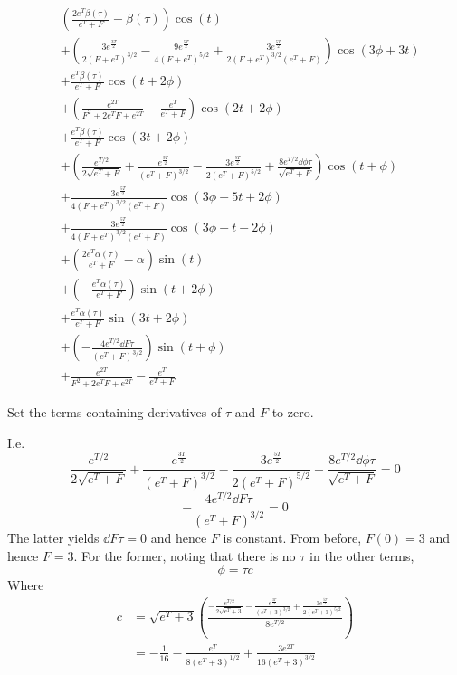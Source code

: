 \documentclass{X:/Documents/Coding/Latex/myassignment}
\begin{document}
\begin{enumerate}
\begin{enumerate}
\begin{align*}
	&\left(\frac{2e^T\beta \left(\tau \right)}{e^T+F}-\beta \left(\tau \right)\right)\cos\left(t\right)\\
	&+\left(\frac{3e^{\frac{3T}{2}}}{2{\left(F+e^T\right)}^{3/2}}-\frac{9e^{\frac{5T}{2}}}{4{\left(F+e^T\right)}^{5/2}}+\frac{3e^{\frac{5T}{2}}}{2{\left(F+e^T\right)}^{3/2}\left(e^T+F\right)}\right)\cos\left(3\phi +3t\right)\\
	&+\frac{e^T\beta \left(\tau \right)}{e^T+F}\cos\left(t+2\phi\right)\\
	&+\left(\frac{e^{2T}}{{F}^2+2e^TF+e^{2T}}-\frac{e^T}{e^T+F}\right)\cos\left(2t+2\phi\right)\\
	&+\frac{e^T\beta \left(\tau \right)}{e^T+F}\cos\left(3t+2\phi\right)\\
	&+\left(\frac{e^{T/2}}{2\sqrt{e^T+F}}+\frac{e^{\frac{3T}{2}}}{{\left(e^T+F\right)}^{3/2}}-\frac{3e^{\frac{5T}{2}}}{2{\left(e^T+F\right)}^{5/2}}+\frac{8e^{T/2}\dd{\phi}{\tau}}{\sqrt{e^T+F}}\right)\cos\left(t+\phi\right)\\
	&+\frac{3e^{\frac{5T}{2}}}{4{\left(F+e^T\right)}^{3/2}\left(e^T+F\right)}\cos\left(3\phi +5t+2\phi\right)\\
	&+\frac{3e^{\frac{5T}{2}}}{4{\left(F+e^T\right)}^{3/2}\left(e^T+F\right)}\cos\left(3\phi +t-2\phi\right)\\
	&+\left(\frac{2e^T\alpha \left(\tau \right)}{e^T+F}-\alpha\right)\sin\left(t\right)\\
	&+\left(-\frac{e^T\alpha \left(\tau \right)}{e^T+F}\right)\sin\left(t+2\phi\right)\\
	&+\frac{e^T\alpha \left(\tau \right)}{e^T+F}\sin\left(3t+2\phi\right)\\
	&+\left(-\frac{4e^{T/2}\dd{F}{\tau}}{{\left(e^T+F\right)}^{3/2}}\right)\sin\left(t+\phi\right)\\
	&+\frac{e^{2T}}{{F}^2+2e^TF+e^{2T}}-\frac{e^T}{e^T+F}
\end{align*}

	Set the terms containing derivatives of $\tau$ and $F$ to zero.

	I.e.
	\[\frac{e^{T/2}}{2\sqrt{e^T+F}}+\frac{e^{\frac{3T}{2}}}{{\left(e^T+F\right)}^{3/2}}-\frac{3e^{\frac{5T}{2}}}{2{\left(e^T+F\right)}^{5/2}}+\frac{8e^{T/2}\dd{\phi}{\tau}}{\sqrt{e^T+F}} =0\]
	\[-\frac{4e^{T/2}\dd{F}{\tau}}{{\left(e^T+F\right)}^{3/2}} =0\]
	The latter yields $\dd{F}{\tau} = 0$ and hence $F$ is constant. From before, $F(0) = 3$ and hence $F = 3$.
	For the former, noting that there is no $\tau$ in the other terms, 
	\[\phi = \tau c\]
	Where
	\begin{align*}
		c &= \sqrt{e^T+3}\left(\frac{-\frac{e^{T/2}}{2\sqrt{e^T+3}}-\frac{e^{\frac{3T}{2}}}{{\left(e^T+3\right)}^{3/2}}+\frac{3e^{\frac{5T}{2}}}{2{\left(e^T+3\right)}^{5/2}}}{8e^{T/2}}\right)\\
		&= -\frac{1}{16} - \frac{e^T}{8(e^T+3)^{1/2}} + \frac{3e^{2T}}{16(e^{T}+3)^{3/2}}
	\end{align*}


\end{enumerate}
\end{enumerate}
\end{document}
